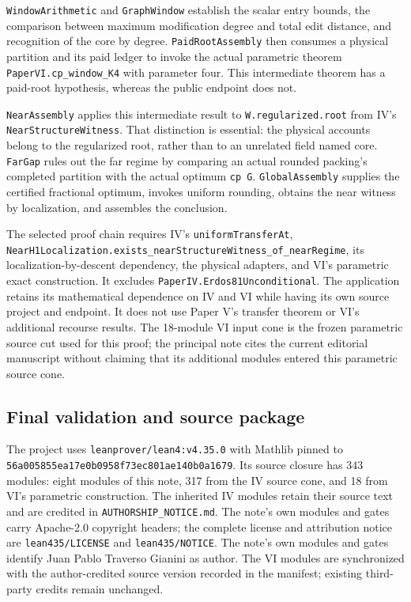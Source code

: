 \documentclass[english,11pt,a4paper]{article}
\begin{document}
\nolinkurl{WindowArithmetic} and \nolinkurl{GraphWindow} establish the scalar
entry bounds, the comparison between maximum modification degree and
total edit distance, and recognition of the core by degree.
\nolinkurl{PaidRootAssembly} then consumes a physical partition and its
paid ledger to invoke the actual parametric theorem
\nolinkurl{PaperVI.cp_window_K4} with parameter four. This intermediate
theorem has a paid-root hypothesis, whereas the public endpoint does
not.

\nolinkurl{NearAssembly} applies this intermediate result to
\nolinkurl{W.regularized.root} from IV's \nolinkurl{NearStructureWitness}.
That distinction is essential: the physical accounts belong to the
regularized root, rather than to an unrelated field named core.
\nolinkurl{FarGap} rules out the far regime by comparing an actual rounded
packing's completed partition with the actual optimum \texttt{cp\ G}.
\nolinkurl{GlobalAssembly} supplies the certified fractional optimum,
invokes uniform rounding, obtains the near witness by localization, and
assembles the conclusion.

The selected proof chain requires IV's \nolinkurl{uniformTransferAt},
\nolinkurl{NearH1Localization.exists_nearStructureWitness_of_nearRegime},
its localization-by-descent dependency, the physical adapters, and VI's
parametric exact construction. It excludes
\nolinkurl{PaperIV.Erdos81Unconditional}. The application retains its
mathematical dependence on IV and VI while having its own source project
and endpoint. It does not use Paper V's transfer theorem or VI's
additional recourse results. The 18-module VI input cone is the frozen
parametric source cut used for this proof; the principal note cites the
current editorial manuscript without claiming that its additional
modules entered this parametric source cone.

\subsection{Final validation and source
package}\label{final-validation-and-source-package}

The project uses \nolinkurl{leanprover/lean4:v4.35.0} with Mathlib pinned
to \nolinkurl{56a005855ea17e0b0958f73ec801ae140b0a1679}. Its source closure
has 343 modules: eight modules of this note, 317 from the IV source
cone, and 18 from VI's parametric construction. The inherited IV modules
retain their source text and are credited in
\nolinkurl{AUTHORSHIP_NOTICE.md}. The note's own modules and gates carry
Apache-2.0 copyright headers; the complete license and attribution
notice are \nolinkurl{lean435/LICENSE} and \nolinkurl{lean435/NOTICE}. The
note's own modules and gates identify Juan Pablo Traverso Gianini as
author. The VI modules are synchronized with the author-credited source
version recorded in the manifest; existing third-party credits remain
unchanged.
\end{document}
